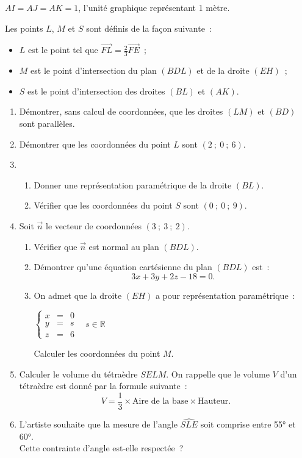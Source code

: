 $AI=AJ=AK=1$, l'unité graphique représentant 1 mètre.
\par
Les points $L$, $M$ et $S$ sont définis de la façon suivante~:
\begin{itemize}
     \item $L$ est le point tel que $\overrightarrow{FL}=\frac23\overrightarrow{FE}$~;
     \item $M$ est le point d'intersection du plan $(BDL)$ et de la droite $(EH)$~;
     \item $S$ est le point d'intersection des droites $(BL)$ et $(AK)$.
\end{itemize}
\begin{enumerate}
     \item Démontrer, sans calcul de coordonnées, que les droites $(LM)$ et $(BD)$ sont parallèles.
     \item Démontrer que les coordonnées du point $L$ sont $(2~;~0~;~6)$.
     \item \begin{enumerate}[label=\alph*.]
          \item Donner une représentation paramétrique de la droite $(BL)$.
          \item Vérifier que les coordonnées du point $S$ sont $(0~;~0~;~9)$.
     \end{enumerate}
     \item Soit $\overrightarrow{n}$ le vecteur de coordonnées $(3~;~3~;~2)$.
     \begin{enumerate}[label=\alph*.]
          \item Vérifier que $\overrightarrow{n}$ est normal au plan $(BDL)$.
          \item Démontrer qu'une équation cartésienne du plan $(BDL)$ est~:
          \[
          3x+3y+2z-18=0.
          \]
          \item On admet que la droite $(EH)$ a pour représentation paramétrique~:

\begin{center}
         $ \left\{
               \begin{array}{rcl}
                    x&=&0\\
                    y&=&s\\
                    z&=&6
               \end{array}
          \right.~~~~s\in\mathbb{R}$
\end{center}

          Calculer les coordonnées du point $M$.
     \end{enumerate}
     \item Calculer le volume du tétraèdre $SELM$. On rappelle que le volume $V$ d'un tétraèdre est donné par la formule suivante~:
     \[
     V=\frac13\times\text{Aire de la base}\times\text{Hauteur}.
     \]
     \item L'artiste souhaite que la mesure de l'angle $\widehat{SLE}$ soit comprise entre 55° et 60°.\\
     Cette contrainte d'angle est-elle respectée~?
\end{enumerate}
